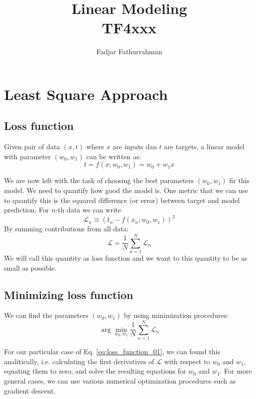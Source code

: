 \documentclass[a4paper,11pt]{article} %
\newcommand{\highlight}[1]{\colorbox{red!25}{#1}}
\begin{document}
\title{Linear Modeling\\
TF4xxx}
\author{Fadjar Fathurrahman}
\date{}
\maketitle

\section{Least Square Approach}

\subsection{Loss function}

Given pair of data $(x,t)$ where $x$ are inputs dan $t$
are targets, a linear model with parameter $(w_0, w_1)$ can
be written as:
\begin{equation}
t = f(x; w_0, w_1) = w_0 + w_1 x
\label{eq:model_linear_01}
\end{equation}

We are now left with the task of choosing the best parameters $(w_0, w_1)$
fir this model.
We need to quantify how good the model is.
One metric that we can use to quantify this is the squared difference (or
error) between target and model prediction. For $n$-th data we can write
$$
\mathcal{L}_n \equiv \left( t_n - f(x_n; w_0, w_1) \right)^2
$$
%
By summing contributions from all data:
\begin{equation}
\mathcal{L} = \frac{1}{N} \sum_{n=1}^{N} \mathcal{L}_n
\label{eq:loss_function_01}
\end{equation}
We will call this quantity as \highlight{loss function}
and we want to this quantity to be as small as possible.

\subsection{Minimizing loss function}

We can find the parameters $(w_{0},w_{1})$ by using minimization procedures:
\begin{equation}
\arg\min_{w_{0},w_{1}} \frac{1}{N} \sum_{n=1}^{N} \mathcal{L}_{n}
\end{equation}

For our particular case of Eq. \eqref{eq:loss_function_01}, we can found this analitically,
i.e. calculating the first derivatives of $\mathcal{L}$ with respect to $w_0$ and $w_1$, equating
them to zero, and solve the resulting equations for $w_0$ and $w_1$.
For more general cases, we can use various numerical optimization procedures such as
gradient descent.
\end{document}
